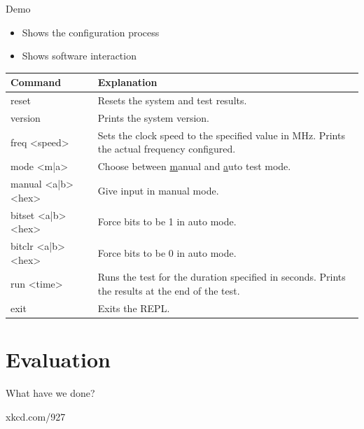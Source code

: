 \documentclass[t]{beamer}
\begin{document}
\begin{frame}{Demo}
  \begin{itemize}
    \item Shows the configuration process
    \item Shows software interaction
  \end{itemize}
  \begin{table}[H]
    \centering
    \begin{tabular}{|>{\ttfamily\scriptsize}p{8em}|>{\scriptsize}p{\dimexpr\textwidth-12em}|}
      \hline
      \textrm{Command}   & Explanation \\
      \hline
      reset              & Resets the system and test results. \\
      version            & Prints the system version. \\
      freq <speed>       & Sets the clock speed to the specified value in MHz. Prints the actual frequency configured. \\
      mode <m|a>         & Choose between \underline{m}anual and \underline{a}uto test mode. \\
      manual <a|b> <hex> & Give input in manual mode. \\
      bitset <a|b> <hex> & Force bits to be 1 in auto mode. \\
      bitclr <a|b> <hex> & Force bits to be 0 in auto mode. \\
      run <time>         & Runs the test for the duration specified in seconds. Prints the results at the end of the test. \\
      exit               & Exits the REPL. \\
      \hline
    \end{tabular}
  \end{table}
\end{frame}

\section{Evaluation}

\begin{frame}{What have we done?}
  \begin{figure}[H]
    \centering
  \end{figure}
  \small{xkcd.com/927}
\end{frame}
\end{document}
